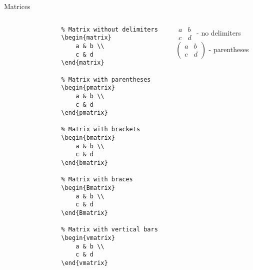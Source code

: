 \begin{frame}[fragile]{Matrices}
    \begin{columns}
        \begin{column}{0.5\textwidth}
            \begin{lstlisting}
                % Matrix without delimiters
                \begin{matrix}
                    a & b \\
                    c & d
                \end{matrix}
                
                % Matrix with parentheses
                \begin{pmatrix}
                    a & b \\
                    c & d
                \end{pmatrix}
                
                % Matrix with brackets
                \begin{bmatrix}
                    a & b \\
                    c & d
                \end{bmatrix}
                
                % Matrix with braces
                \begin{Bmatrix}
                    a & b \\
                    c & d
                \end{Bmatrix}
                
                % Matrix with vertical bars
                \begin{vmatrix}
                    a & b \\
                    c & d
                \end{vmatrix}
            \end{lstlisting}
        \end{column}
        
        \begin{column}{0.5\textwidth}
            \begin{center}
                $\begin{matrix} a & b \\ c & d \end{matrix}$ - no delimiters\\[10pt]
                
                $\begin{pmatrix} a & b \\ c & d \end{pmatrix}$ - parentheses\\[10pt]
                

\end{center}
\end{column}
\end{columns}
\end{frame}
